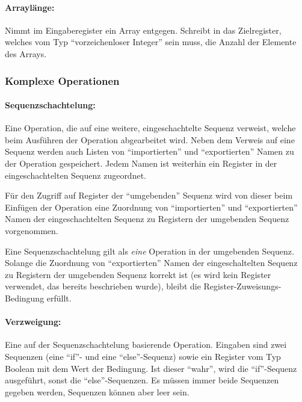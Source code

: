 \documentclass[twoside,a4paper,fleqn,12pt]{book}
\begin{document}


\paragraph{Arraylänge:} Nimmt im Eingaberegister ein Array entgegen. Schreibt in das Zielregister, welches vom Typ "`vorzeichenloser Integer"' sein muss,
die Anzahl der Elemente des Arrays.


\subsubsection{Komplexe Operationen}

\paragraph{Sequenzschachtelung:} Eine Operation, die auf eine weitere, eingeschachtelte Sequenz verweist, welche beim Ausführen der Operation abgearbeitet wird.
Neben dem Verweis auf eine Sequenz werden auch Listen von "`importierten"' und "`exportierten"' Namen zu der Operation gespeichert.
Jedem Namen ist weiterhin ein Register in der eingeschachtelten Sequenz zugeordnet.

Für den Zugriff auf Register der "`umgebenden"' Sequenz wird von dieser 
beim Einfügen der Operation eine Zuordnung von "`importierten"' und "`exportierten"' Namen der
eingeschachtelten Sequenz zu Registern der umgebenden Sequenz vorgenommen. 

Eine Sequenzschachtelung gilt als \emph{eine} Operation in der umgebenden Sequenz. Solange die Zuordnung von "`exportierten"' Namen der
eingeschaltelten Sequenz zu Registern der umgebenden Sequenz korrekt ist (es wird kein Register verwendet, das bereits beschrieben wurde), bleibt die Register-Zuweisungs-Bedingung erfüllt.


\paragraph{Verzweigung:} Eine auf der Sequenzschachtelung basierende Operation. Eingaben sind zwei Sequenzen (eine ``if''- und eine ``else''-Sequenz) sowie ein Register vom
Typ Boolean mit dem Wert der Bedingung. Ist dieser "`wahr"', wird die ``if''-Sequenz ausgeführt, sonst die ``else''-Sequenzen. Es müssen immer beide Sequenzen
gegeben werden, Sequenzen können aber leer sein.
\end{document}
